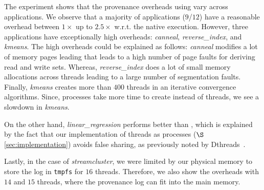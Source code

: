 The experiment shows that the provenance overheads using \projecttitle vary across applications. 
We observe that a majority of applications ($9$/$12$) have a reasonable overhead between $1\times$ up to $2.5\times$ w.r.t. the native execution. However, three applications have exceptionally high overheads:  {\em canneal}, {\em reverse\_index}, and {\em kmeans}. The high overheads could be explained as follows: {\em canneal} modifies a lot of memory pages leading that leads to a high number of page faults for deriving read and write sets. Whereas, {\em reverse\_index} does a lot of small memory allocations across threads leading to a large number of segmentation faults.  Finally, {\em kmeans} creates more than $400$ threads in an iterative convergence algorithms. Since, processes take more time to create instead of threads, we see a slowdown in {\em kmeans}.


On the other hand, {\em linear\_regression} performs better than \pthreads, which is explained by the fact that our implementation of threads as processes ($\S$\ref{sec:implementation})  avoids false sharing, as previously noted by Dthreads~\cite{dthreads-sosp-2011}.



Lastly, in the case of {\em streamcluster}, we were limited by our physical memory to store the log in {\tt tmpfs} for $16$ threads. Therefore, we also show the overheads with $14$ and $15$ threads,  where the provenance log can fit into the main memory.  %



%

